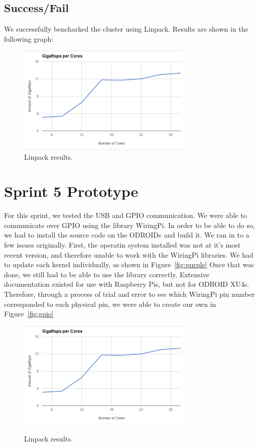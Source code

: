 \subsection{Success/Fail}

We successfully bencharked the cluster using Linpack. Results are shown in the following graph:

\begin{figure}[tbh]
	\caption{Linpack results.}
	\centering
		\includegraphics[width=0.75\textwidth]{minimalgraph.JPG}
\end{figure}

\section{Sprint 5 Prototype}

For this sprint, we tested the USB and GPIO communication. We were able to communicate over GPIO using the library WiringPi. In order to be able to do so, we had to install the source code on the ODROIDs and build it. We ran in to a few issues originally. First, the operatin system installed was not at it's most recent version, and therefore unable to work with the WiringPi libraries. We had to update each kernel individually, as shown in Figure~\ref{fig:purple} Once that was done, we still had to be able to use the library correctly. Extensive documentation existed for use with Raspberry Pis, but not for ODROID XU4s. Therefore, through a process of trial and error to see which WiringPi pin number corresponded to each physical pin, we were able to create our own in Figure~\ref{fig:gpio} \\

\begin{figure}[tbh]
	\caption{Linpack results.}
	\centering
		\includegraphics[width=0.75\textwidth]{minimalgraph.JPG}
	\label{fig:minimal}
\end{figure}

